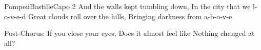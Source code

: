 \begin{song}{Pompeii}{Bastille}{Capo 2}
And the walls kept tumbling down, In the city that we l-o-v-e-d
Great clouds roll over the hills, Bringing darkness from a-b-o-v-e


Post-Chorus:
If you close your eyes, Does it almost feel like
Nothing changed at all?

\end{song}

